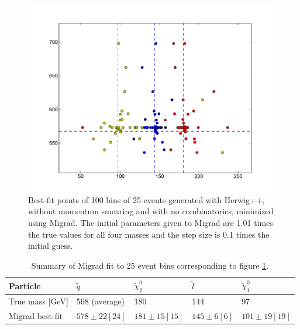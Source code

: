 \documentclass[twoside,english]{uiofysmaster}
\begin{document}
\begin{figure}[hbt]
\centering
\includegraphics[scale=0.7]{figures/herwig_migrad_1p01_initial_guess_0p1_error.pdf} 
\caption{Best-fit points of 100 bins of 25 events generated with Herwig++, without momentum smearing and with no combinatorics, minimized using Migrad. The initial parameters given to Migrad are 1.01 times the true values for all four masses and the step size is 0.1 times the initial guess.}
\label{fig:herwig_migrad_nosmear_1p01}
\end{figure}



\begin{table}[hbt]
	\centering
	\begin{tabular}{| l | l | l | l | l |}
		\hline
		Particle 			& $\tilde q$	& $\tilde \chi_2^0$	& $\tilde l$	& $\tilde \chi_1^0$ \\ \hline
		True mass [GeV]		& 568 (average) & 180 				& 144 			& 97 				\\ \hline
		Migrad best-fit 	& $578 \pm 22 [24]$ 	& $181 \pm 15 [15]$ 	& $145 \pm 6 [6]$	& $101 \pm 19 [19]$ \\ \hline
	\end{tabular}
	\caption{Summary of Migrad fit to 25 event bins corresponding to figure \ref{fig:herwig_migrad_nosmear_1p01}.}
	\label{table:herwig_migrad_nosmear_1p01}
\end{table}
\end{document}
